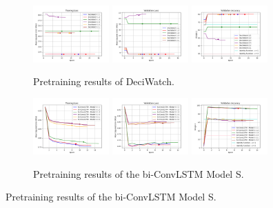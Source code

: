 \documentclass[./main.tex]{subfiles}
\begin{document}
\begin{figure}[htbp]
    \begin{subfigure}[b]{\textwidth}
        \centering
        \includegraphics[width=0.32\textwidth]{./entities/pretrained/deciwatch/train_losses.png}
        \includegraphics[width=0.32\textwidth]{./entities/pretrained/deciwatch/val_losses.png}
        \includegraphics[width=0.32\textwidth]{./entities/pretrained/deciwatch/val_accs.png}
        \caption{Pretraining results of DeciWatch.}
    \end{subfigure}
   \hfill

   \begin{subfigure}[b]{\textwidth}
    \centering
    \includegraphics[width=0.32\textwidth]{./entities/pretrained/unipose/train_losses.png}
    \includegraphics[width=0.32\textwidth]{./entities/pretrained/unipose/val_losses.png}
    \includegraphics[width=0.32\textwidth]{./entities/pretrained/unipose/val_accs.png}
    \caption{Pretraining results of the bi-ConvLSTM Model S.}
    \end{subfigure}
    \hfill


\end{figure}
\end{document}
